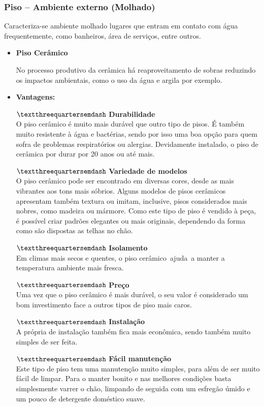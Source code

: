 \subsubsection{Piso – Ambiente externo (Molhado)}
	Caracteriza-se ambiente molhado lugares que entram em contato com água frequentemente, como banheiros, área de serviços, entre outros.

\begin{itemize}

\item \textbf{Piso Cerâmico}

	No processo produtivo da cerâmica há reaproveitamento de sobras reduzindo os impactos ambientais, como o uso da água e argila por exemplo.

\item \textbf{Vantagens:}

$\textthreequartersemdash$ \textbf{Durabilidade}\\O piso cerâmico é muito mais durável que outro tipo de pisos. É também muito resistente à água e bactérias, sendo por isso uma boa opção para quem sofra de problemas respiratórios ou alergias. Devidamente instalado, o piso de cerâmica por durar por 20 anos ou até mais.

$\textthreequartersemdash$ \textbf{Variedade de modelos}\\O piso cerâmico pode ser encontrado em diversas cores, desde as mais vibrantes aos tons mais sóbrios. Alguns modelos de pisos cerâmicos apresentam também textura ou imitam, inclusive, pisos considerados mais nobres, como madeira ou mármore. Como este tipo de piso é vendido à peça, é possível criar padrões elegantes ou mais originais, dependendo da forma como são dispostas as telhas no chão.

$\textthreequartersemdash$ \textbf{Isolamento}\\Em climas mais secos e quentes, o piso cerâmico ajuda a manter a temperatura ambiente mais fresca.

$\textthreequartersemdash$ \textbf{Preço}\\Uma vez que o piso cerâmico é mais durável, o seu valor é considerado um bom investimento face a outros tipos de piso mais caros.

$\textthreequartersemdash$ \textbf{Instalação}\\A própria de instalação também fica mais econômica, sendo também muito simples de ser feita.

$\textthreequartersemdash$ \textbf{Fácil manutenção}\\Este tipo de piso tem uma manutenção muito simples, para além de ser muito fácil de limpar. Para o manter bonito e nas melhores condições basta simplesmente varrer o chão, limpando de seguida com um esfregão úmido e um pouco de detergente doméstico suave.


\end{itemize}
